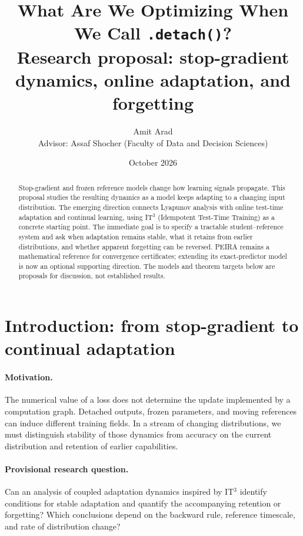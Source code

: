 \documentclass[11pt,a4paper]{article}
\title{What Are We Optimizing When We Call \texttt{.detach()}?\\[0.4em]
\large Research proposal: stop-gradient dynamics, online adaptation, and forgetting}
\author{Amit Arad\\[0.3em]
\small Advisor: Assaf Shocher (Faculty of Data and Decision Sciences)}
\date{October 2026}
\begin{document}
\maketitle

\begin{abstract}
Stop-gradient and frozen reference models change how learning signals propagate.
This proposal studies the resulting dynamics as a model keeps adapting to a
changing input distribution. The emerging direction connects Lyapunov analysis
with online test-time adaptation and continual learning, using IT$^3$
(Idempotent Test-Time Training) as a concrete starting point. The immediate
goal is to specify a tractable student--reference system and ask when
adaptation remains stable, what it retains from earlier distributions, and
whether apparent forgetting can be reversed. PEIRA remains a mathematical
reference for convergence certificates; extending its exact-predictor model
is now an optional supporting direction. The models and theorem targets below
are proposals for discussion, not established results.
\end{abstract}

\section{Introduction: from stop-gradient to continual adaptation}
\label{sec:introduction}
\paragraph{Motivation.}
The numerical value of a loss does not determine the update implemented by a
computation graph. Detached outputs, frozen parameters, and moving references
can induce different training fields. In a stream of changing distributions,
we must distinguish stability of those dynamics from accuracy on the current
distribution and retention of earlier capabilities.

\paragraph{Provisional research question.}
Can an analysis of coupled adaptation dynamics inspired by IT$^3$ identify
conditions for stable adaptation and quantify the accompanying retention or
forgetting? Which conclusions depend on the backward rule, reference timescale,
and rate of distribution change?
\end{document}
